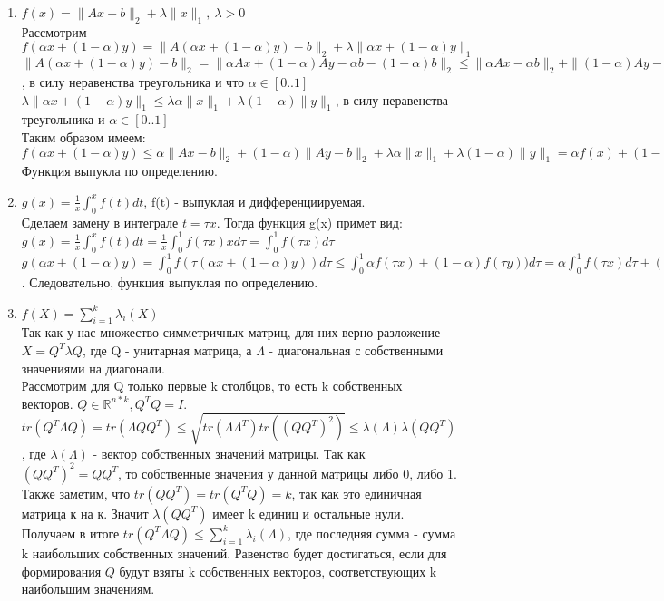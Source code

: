 \documentclass[12pt]{extreport}
\theoremstyle{definiton}
\theoremstyle{definition}
\theoremstyle{definition}
\let\leq\leqslant
\begin{document}
\begin{enumerate}
        \item $f(x)=\|Ax-b\|_2 + \lambda\|x\|_1,\ \lambda>0$
        \newline
        \\Рассмотрим $f(\alpha x + (1-\alpha)y) = \|A(\alpha x + (1-\alpha)y)-b\|_2 + \lambda\|\alpha x + (1-\alpha)y\|_1$
        \\$\|A(\alpha x + (1-\alpha)y)-b\|_2 = \|\alpha Ax + (1-\alpha)Ay-\alpha b - (1-\alpha)b\|_2 \leq \|\alpha Ax -\alpha b\|_2 + \|(1-\alpha)Ay- (1-\alpha)b\|_2 = \alpha\|Ax -b\|_2 + (1-\alpha)\|Ay-b\|_2$, в силу неравенства треугольника и что $\alpha \in [0..1]$
        \\$\lambda\|\alpha x + (1-\alpha)y\|_1 \leq \lambda \alpha\|x\|_1 + \lambda (1-\alpha)\|y\|_1$, в силу неравенства треугольника и $\alpha \in [0..1]$
        \\Таким образом имеем: $f(\alpha x + (1-\alpha)y) \leq \alpha\|Ax -b\|_2 + (1-\alpha)\|Ay-b\|_2 + \lambda \alpha\|x\|_1 + \lambda (1-\alpha)\|y\|_1 = \alpha f(x) + (1-\alpha)f(y)$
        \\ Функция выпукла по определению.
        \item $g(x)=\frac{1}{x}\int_0^xf(t)dt$, f(t) - выпуклая и дифференциируемая.
        \\Сделаем замену в интеграле $t=\tau x$. Тогда функция g(x) примет вид: $g(x) = \frac{1}{x}\int_0^xf(t)dt = \frac{1}{x}\int_0^1f(\tau x)xd\tau = \int_0^1f(\tau x)d\tau$
        \\$g(\alpha x + (1-\alpha)y) = \int_0^1f(\tau (\alpha x + (1-\alpha)y))d\tau \leq \int_0^1\alpha f(\tau x) + (1-\alpha)f(\tau y))d\tau = \alpha \int_0^1 f(\tau x)d\tau + (1-\alpha)\int_0^1(\tau y)d\tau = \alpha g(x) + (1-\alpha)g(y)$. Следовательно, функция выпуклая по определению.
        \item $f(X) = \sum_{i=1}^{k}\lambda_i(X)$
        \\ Так как у нас множество симметричных матриц, для них верно разложение $X = Q^T\lambda Q$, где Q - унитарная матрица, а $\Lambda$ - диагональная с собственными значениями на диагонали.
        \\ Рассмотрим для Q только первые k столбцов, то есть k собственных векторов. $Q \in \mathbb{R}^{n*k}, Q^TQ = I$.
        \\ $tr(Q^T\Lambda Q) = tr(\Lambda QQ^T) \leq \sqrt{tr(\Lambda \Lambda^T)tr((QQ^T)^2)} \leq \lambda(\Lambda) \lambda(QQ^T)$, где $\lambda(\Lambda)$ - вектор собственных значений матрицы. Так как $(QQ^T)^2 = QQ^T$, то собственные значения у данной матрицы либо 0, либо 1. Также заметим, что $tr(QQ^T) = tr(Q^TQ)=k$, так как это единичная матрица к на к. Значит $\lambda(QQ^T)$ имеет k единиц и остальные нули. Получаем в итоге $tr(Q^T\Lambda Q) \leq \sum_{i=1}^k \lambda_i(\Lambda)$, где последняя сумма - сумма k наибольших собственных значений. Равенство будет достигаться, если для формирования $Q$ будут взяты k собственных векторов, соответствующих k наибольшим значениям.

\end{enumerate}
\end{document}
